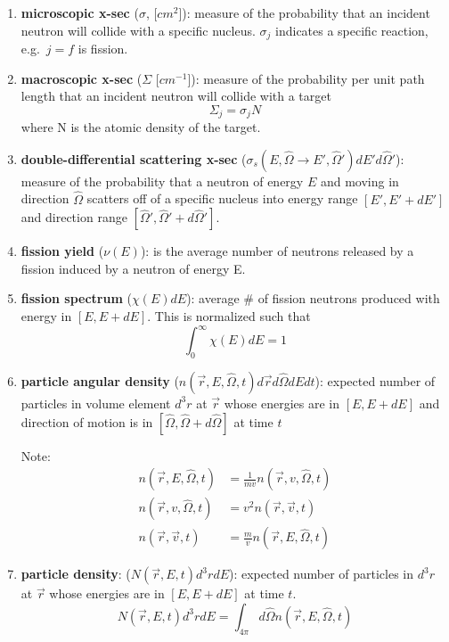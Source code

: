 \documentclass[12pt]{article}
\newcommand{\vOmega}{\ensuremath{\hat{\Omega}}}
\begin{document}
\begin{enumerate}
\item \textbf{microscopic x-sec} ($\sigma$, [$cm^2$]): measure of the probability that an incident neutron will collide with a specific nucleus. $\sigma_j$ indicates a specific reaction, e.g.\ $j=f$ is fission.

\item \textbf{macroscopic x-sec} ($\Sigma$ [$cm^{-1}$]): measure of the probability per unit path length that an incident neutron will collide with a target
\[\Sigma_j = \sigma_j N\]
where N is the atomic density of the target.

\item \textbf{double-differential scattering x-sec} ($\sigma_s(E, \vOmega \rightarrow E', \vOmega')dE' d\vOmega'$): measure of the probability that a neutron of energy $E$ and moving in direction $\vOmega$ scatters off of a specific nucleus into energy range $[E', E' + dE']$ and direction range $[\vOmega', \vOmega' + d\vOmega']$.

\item \textbf{fission yield} ($\nu(E)$): is the average number of neutrons released by a fission induced by a neutron of energy E.

\item \textbf{fission spectrum} ($\chi(E)dE$): average \# of fission neutrons produced with energy in $[E, E + dE]$. This is normalized such that
\[\int_0^{\infty} \chi(E)dE =1\]


\item \textbf{particle angular density} ($n(\vec{r}, E, \vOmega, t)d\vec{r} d\vOmega dE dt$): expected number of particles in volume element $d^3r$ at $\vec{r}$ whose energies are in $[E, E + dE]$ and direction of motion is in $[\vOmega, \vOmega + d\vOmega]$ at time $t$

Note:
\begin{align}
n(\vec{r}, E, \vOmega, t) &= \frac{1}{mv}n(\vec{r}, v, \vOmega, t) \\
n(\vec{r}, v, \vOmega, t) &= v^2 n(\vec{r}, \vec{v}, t) \\
n(\vec{r}, \vec{v}, t) &= \frac{m}{v}n(\vec{r}, E, \vOmega, t)
\end{align}

\item \textbf{particle density}: ($N(\vec{r},E,t)d^3r dE$): expected number of particles in $d^3r$ at $\vec{r}$ whose energies are in $[E, E + dE]$ at time $t$.
\[N(\vec{r},E,t)d^3r dE = \int_{4\pi} d\vOmega n(\vec{r}, E, \vOmega, t) \]


\end{enumerate}
\end{document}
